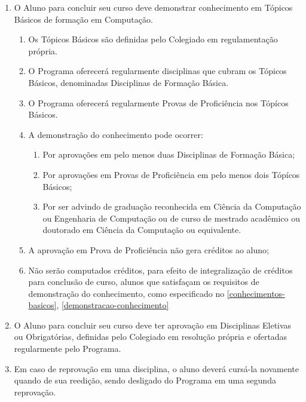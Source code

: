 \documentclass{article}
\newcommand{\grupoMenor}{Colegiado\xspace}
\begin{document}
\begin{enumerate}
	\item \label{conhecimentos-basicos} O Aluno para concluir seu curso deve demonstrar conhecimento em Tópicos Básicos de formação em Computação.
	\begin{enumerate}
		\item Os Tópicos Básicos são definidas pelo \grupoMenor em regulamentação própria.
		\item O Programa oferecerá regularmente disciplinas que cubram os Tópicos Básicos, denominadas Disciplinas de Formação Básica.
		\item O Programa oferecerá regularmente Provas de Proficiência nos Tópícos Básicos.
		\item \label{demonstracao-conhecimento} A demonstração do conhecimento pode ocorrer:

		\begin{enumerate}[label=\Roman*]
			\item Por aprovações em pelo menos duas Disciplinas de Formação Básica;
			\item Por aprovações em Provas de Proficiência em pelo menos dois Tópícos Básicos; 
			\item \label{isentos-conhecimento} Por ser advindo de graduação reconhecida em Ciência da Computação ou Engenharia de Computação ou de curso de mestrado acadêmico ou doutorado em Ciência da Computação ou equivalente.
		\end{enumerate}

		\item A aprovação em Prova de Proficiência não gera créditos ao aluno;

		\item Não serão computados créditos, para efeito de integralização de créditos para conclusão de curso, alunos que satisfaçam os requisitos de demonstração do conhecimento, como especificado no \ref{conhecimentos-basicos}, \ref{demonstracao-conhecimento}

		
	\end{enumerate}

	\item O Aluno para concluir seu curso deve ter aprovação em Disciplinas Eletivas ou Obrigatórias, definidas pelo \grupoMenor em resolução própria e ofertadas regularmente pelo Programa.

    \item Em caso de reprovação em uma disciplina, o aluno deverá cursá-la novamente quando de sua reedição, sendo desligado do Programa em uma segunda reprovação.


\end{enumerate}
\end{document}
